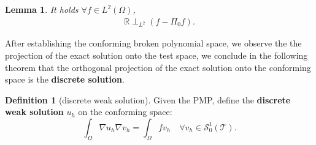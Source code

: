 \documentclass[a4paper,12pt,oneside,fleqn]{book}
\newtheorem{lemma}[theorem]{Lemma}
\theoremstyle{definition}
\newtheorem{definition}{Definition}[section]
\theoremstyle{remark}
\begin{document}
\begin{lemma}
	It holds $\forall f \in L^2(\Omega)$, 
	\begin{align*}
		\mathbb{R} \perp_{L^2} (f - \Pi_0 f).  
	\end{align*}
\end{lemma}

After establishing the conforming broken polynomial space, we observe the the projection of the exact solution onto the test space, we conclude in the following theorem that the orthogonal projection of the exact solution onto the conforming space is the \textbf{discrete solution}.

\begin{definition}[discrete weak solution]
	Given the PMP, define the \textbf{discrete weak solution} $u_h$ on the conforming space:
	\begin{equation}
		\int_\Omega \nabla u_h \nabla v_h = \int_\Omega f v_h \quad \forall v_h \in \mathcal{S}_0^1(\mathcal{T}). 
	\end{equation}
\end{definition}
\end{document}
